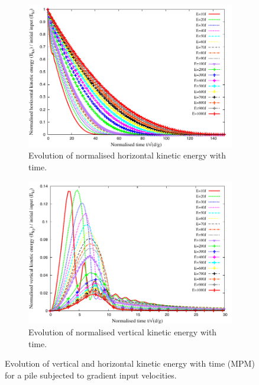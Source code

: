 \documentclass[3p,times,procedia,number]{elsarticle}
\begin{document}
\begin{figure}[tbhp]
  \centering
  \begin{subfigure}[b]{0.4\textwidth}
    \includegraphics[width=\textwidth]{figs/Normalised_KEx_Slope}
    \caption{Evolution of normalised horizontal kinetic energy with time.}
    \label{fig:Normalised_KEx_Slope}
  \end{subfigure}
  \begin{subfigure}[b]{0.4\textwidth}
    \centering
    \includegraphics[width=\textwidth]{figs/Normalised_KEy_Slope}
    \caption{Evolution of normalised vertical kinetic energy with time.}
    \label{fig:Normalised_KEy_Slope}
  \end{subfigure}
  \caption{Evolution of vertical and horizontal kinetic energy with time (MPM) 
  for a pile subjected to gradient input velocities.}
  \label{fig:Normalised_KEx_KEy_Slope}
\end{figure}
\end{document}
